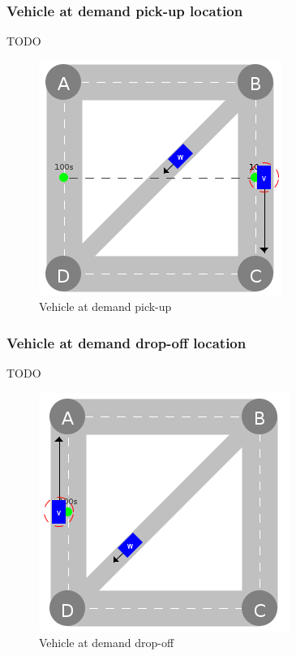 \documentclass{IEEEtran}
\begin{document}
    \subsubsection{Vehicle at demand pick-up location}
    TODO

    \begin{figure}[htbp]
        \centering
        \includegraphics[scale=0.5]{../../events/vehicle-at-demand-pick-up.png}
        \caption{Vehicle at demand pick-up}
        \label{fig:vehicle-at-demand-pick-up}
    \end{figure}

    \subsubsection{Vehicle at demand drop-off location}
    TODO

    \begin{figure}[htbp]
        \centering
        \includegraphics[scale=0.5]{../../events/vehicle-at-demand-drop-off.png}
        \caption{Vehicle at demand drop-off}
        \label{fig:vehicle-at-demand-drop-off}
    \end{figure}
\end{document}
